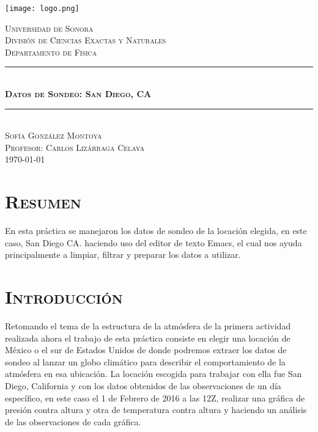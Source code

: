 \documentclass[12pt]{article}
\begin{document}

\begin{titlepage}
\newcommand{\Hrule}{\rule{\linewidth}{0.5mm}}

\begin{center}
\texttt{[image: logo.png]}
\end{center}

\begin{center}
\textsc{\LARGE Universidad de Sonora}\\[0.5cm]
\textsc{División de Ciencias Exactas y Naturales}\\[0.1cm]
\textsc{Departamento de Física}\\[1.5cm]
\Hrule \\[0.5cm]   
   \textsc{\LARGE \bfseries Datos de Sondeo: San Diego, CA} \\[0.5cm]
\Hrule \\[1.5cm]
\textsc{\Large Sofía González Montoya} \\[1cm]
\textsc{\Large Profesor: Carlos Lizárraga Celaya} \\[2.5cm]
\textsc{\today}
\end{center}
\end{titlepage}
\pagebreak

\doublespacing
\section{\textsc{Resumen}}
En esta práctica se manejaron los datos de sondeo de la locación elegida, en este caso, San Diego CA. haciendo uso del editor de texto Emacs, el cual nos ayuda principalmente a limpiar, filtrar y preparar los datos a utilizar.

\section{\textsc{Introducción}}
Retomando el tema de la estructura de la atmósfera de la primera actividad realizada ahora el trabajo de esta práctica consiste en elegir una locación de México o el sur de Estados Unidos de donde podremos extraer los datos de sondeo al lanzar un globo climático para describir el comportamiento de la atmósfera en esa ubicación. La locación escogida para trabajar con ella fue San Diego, California y con los datos obtenidos de las observaciones de un día específico, en este caso el 1 de Febrero de 2016 a las 12Z, realizar una gráfica de presión contra altura y otra de temperatura contra altura y haciendo un análisis de las observaciones de cada gráfica. \\
\end{document}
